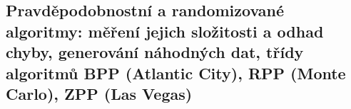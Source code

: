 \subsection{Pravděpodobnostní a randomizované algoritmy: měření jejich složitosti a odhad chyby, generování náhodných dat, třídy algoritmů BPP (Atlantic City), RPP (Monte Carlo), ZPP (Las Vegas)}